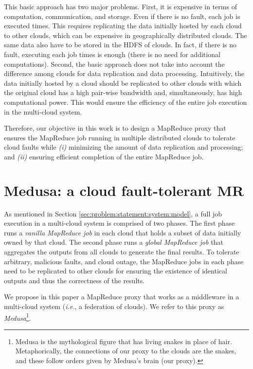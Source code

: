 \documentclass[10pt, conference, compsocconf]{IEEEtran}
\begin{document}
This basic approach has two major problems. First, it is expensive in terms of computation, communication, and storage. Even if there is no fault, each job is executed  times. This requires replicating the data initially hosted by each cloud to  other clouds, which can be expensive in geographically distributed clouds. The same data also have to be stored in the HDFS of  clouds. In fact, if there is no fault, executing each job  times is enough (there is no need for additional computations). Second, the basic approach does not take into account the difference among clouds for data replication and data processing. Intuitively, the data initially hosted by a cloud should be replicated to other clouds with which the original cloud has a high pair-wise bandwidth and, simultaneously, has high computational power. This would ensure the efficiency of the entire job execution in the multi-cloud system.

Therefore, our objective in this work is to design a MapReduce proxy that ensures the MapReduce job running in multiple distributed clouds to tolerate cloud faults while \textit{(i)} minimizing the amount of data replication and processing; and \textit{(ii)} ensuring efficient completion of the entire MapReduce job.

\section{Medusa: a cloud fault-tolerant MR}
\label{sec:solution:definition}

As mentioned in Section \ref{sec:problem:statement:system:model}, a full job execution in a multi-cloud system is comprised of two phases. The first phase runs a \emph{vanilla MapReduce job} in each cloud that holds a subset of data initially owned by that cloud. The second phase runs a \emph{global MapReduce job} that aggregates the outputs from all clouds to generate the final results. To tolerate arbitrary, malicious faults, and cloud outage, the MapReduce jobs in each phase need to be replicated to other clouds for ensuring the existence of  identical outputs and thus the correctness of the results.

We propose in this paper a MapReduce proxy that works as a middleware in a multi-cloud system (\textit{i.e.}, a federation of clouds).
We refer to this proxy as \textit{Medusa}\footnote{Medusa is the mythological figure that has living snakes in place of hair. Metaphorically, the connections of our proxy to the clouds are the snakes, and these follow orders given by Medusa's brain (our proxy).}.
\end{document}
